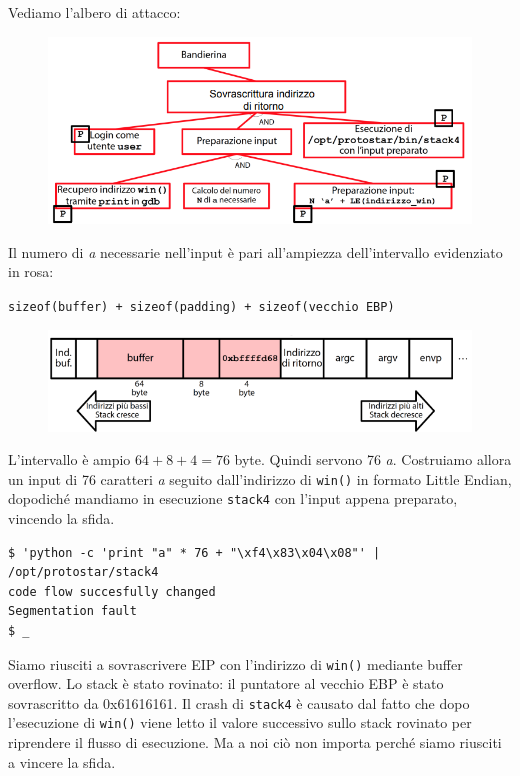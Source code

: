 Vediamo l'albero di attacco:

\begin{figure}[hbpt!]
    \centering
    \includegraphics[width= 0.8 \textwidth]{./Images/cap7/7.19.png}
\end{figure}
\FloatBarrier

Il numero di \textit{a} necessarie nell'input è pari all'ampiezza dell'intervallo evidenziato in rosa:
\begin{center}
    \texttt{sizeof(buffer) + sizeof(padding) + sizeof(vecchio EBP) }
\end{center}

\begin{figure}[hbpt!]
    \centering
    \includegraphics[width= 0.6 \textwidth]{./Images/cap7/7.20.png}
\end{figure}
\FloatBarrier

L'intervallo è ampio $64+8+4=76$ byte. Quindi servono 76 \textit{a}. Costruiamo allora un input di 76 caratteri \textit{a} seguito dall'indirizzo di \texttt{win()} in formato Little Endian, dopodiché mandiamo in esecuzione \texttt{stack4} con l'input appena preparato, vincendo la sfida.
\begin{mdframed}[backgroundcolor=white!20,shadow=false]
\begin{lstlisting}
$ 'python -c 'print "a" * 76 + "\xf4\x83\x04\x08"' | /opt/protostar/stack4 
code flow succesfully changed
Segmentation fault
$ _
\end{lstlisting}
\end{mdframed}
Siamo riusciti a sovrascrivere EIP con l'indirizzo di \texttt{win()} mediante buffer overflow. Lo stack è stato rovinato: il puntatore al vecchio EBP è stato sovrascritto da 0x61616161. Il crash di \texttt{stack4} è causato dal fatto che dopo l'esecuzione di \texttt{win()} viene letto il valore successivo sullo stack rovinato per riprendere il flusso di esecuzione. Ma a noi ciò non importa perché siamo riusciti a vincere la sfida.

